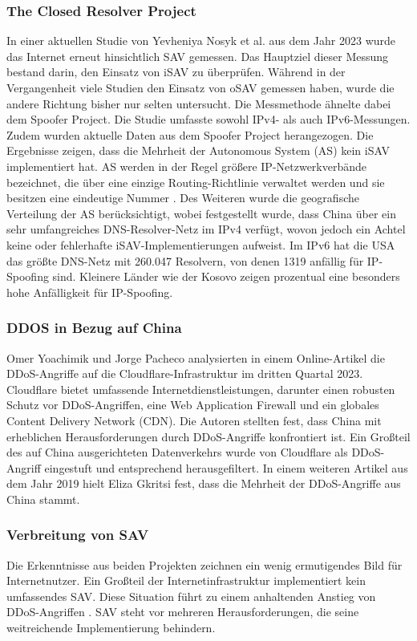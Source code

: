 \documentclass[sigplan,screen]{acmart}
\begin{document}
\subsubsection{The Closed Resolver Project}
In einer aktuellen Studie von Yevheniya Nosyk et al. aus dem Jahr 2023 \cite{CRP01} wurde das Internet erneut hinsichtlich SAV gemessen. Das Hauptziel dieser Messung bestand darin, den Einsatz von iSAV zu überprüfen. Während in der Vergangenheit viele Studien den Einsatz von oSAV gemessen haben, wurde die andere Richtung bisher nur selten untersucht. Die Messmethode ähnelte dabei dem Spoofer Project. Die Studie umfasste sowohl IPv4- als auch IPv6-Messungen. Zudem wurden aktuelle Daten aus dem Spoofer Project herangezogen. Die Ergebnisse zeigen, dass die Mehrheit der Autonomous System (AS) kein iSAV implementiert hat. AS werden in der Regel größere IP-Netzwerkverbände bezeichnet, die über eine einzige Routing-Richtlinie verwaltet werden und sie besitzen eine eindeutige Nummer \cite{as01}. Des Weiteren wurde die geografische Verteilung der AS berücksichtigt, wobei festgestellt wurde, dass China über ein sehr umfangreiches DNS-Resolver-Netz im IPv4 verfügt, wovon jedoch ein Achtel keine oder fehlerhafte iSAV-Implementierungen aufweist. Im IPv6 hat die USA das größte DNS-Netz mit 260.047 Resolvern, von denen 1319 anfällig für IP-Spoofing sind. Kleinere Länder wie der Kosovo zeigen prozentual eine besonders hohe Anfälligkeit für IP-Spoofing.

\subsubsection{DDOS in Bezug auf China}
Omer Yoachimik und Jorge Pacheco \cite{cloudflaeDDoS01} analysierten in einem Online-Artikel die DDoS-Angriffe auf die Cloudflare-Infrastruktur im dritten Quartal 2023. Cloudflare bietet umfassende Internetdienstleistungen, darunter einen robusten Schutz vor DDoS-Angriffen, eine Web Application Firewall und ein globales Content Delivery Network (CDN). Die Autoren stellten fest, dass China mit erheblichen Herausforderungen durch DDoS-Angriffe konfrontiert ist. Ein Großteil des auf China ausgerichteten Datenverkehrs wurde von Cloudflare als DDoS-Angriff eingestuft und entsprechend herausgefiltert. In einem weiteren Artikel aus dem Jahr 2019 hielt Eliza Gkritsi \cite{technode01} fest, dass die Mehrheit der DDoS-Angriffe aus China stammt.

\subsubsection{Verbreitung von SAV}
Die Erkenntnisse aus beiden Projekten zeichnen ein wenig ermutigendes Bild für Internetnutzer. Ein Großteil der Internetinfrastruktur implementiert kein umfassendes SAV. Diese Situation führt zu einem anhaltenden Anstieg von DDoS-Angriffen \cite{CRP01}. SAV steht vor mehreren Herausforderungen, die seine weitreichende Implementierung behindern. 
\end{document}
